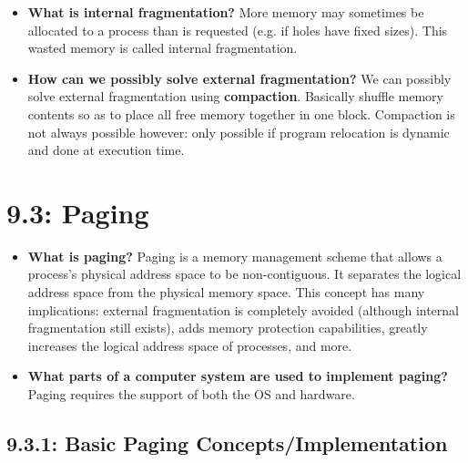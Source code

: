 \documentclass[12pt]{article}
\begin{document}
\begin{itemize}
    \item \textbf{What is internal fragmentation?} More memory may sometimes be allocated to a process than is requested (e.g. if holes have fixed sizes). This wasted memory is called internal fragmentation.
    \item \textbf{How can we possibly solve external fragmentation?} We can possibly solve external fragmentation using \textbf{compaction}. Basically shuffle memory contents so as to place all free memory together in one block. Compaction is not always possible however: only possible if program relocation is dynamic and done at execution time.
\end{itemize}

\section*{9.3: Paging}

\begin{itemize}
    \item \textbf{What is paging?} Paging is a memory management scheme that allows a process's physical address space to be non-contiguous. It separates the logical address space from the physical memory space. This concept has many implications: external fragmentation is completely avoided (although internal fragmentation still exists), adds memory protection capabilities, greatly increases the logical address space of processes, and more. 
    \item \textbf{What parts of a computer system are used to implement paging?} Paging requires the support of both the OS and hardware.
\end{itemize}

\subsection*{9.3.1: Basic Paging Concepts/Implementation}
\end{document}
